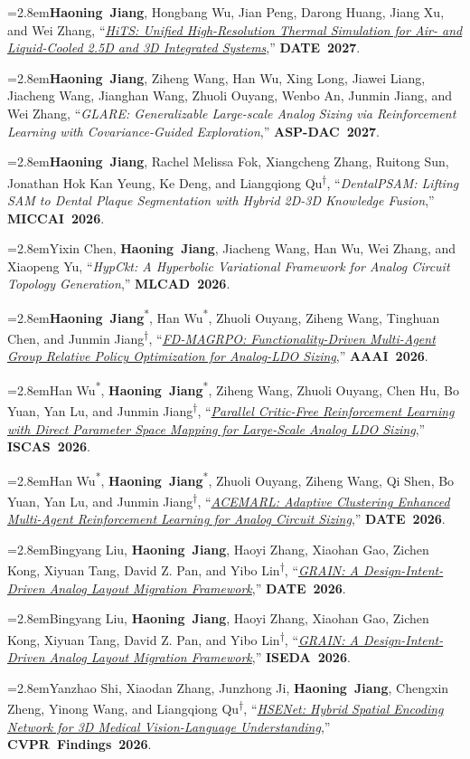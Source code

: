 \documentclass[10pt,a4paper]{article}
\newcommand{\heading}[1]{\par\addvspace{9pt}{\bfseries\underline{\MakeUppercase{#1}}}\par\nopagebreak\vspace{2pt}}
\newcommand{\me}{\textbf{Haoning~Jiang}}
\newcommand{\cor}{\textsuperscript{†}}
\newcommand{\equal}{\textsuperscript{*}}
\newcommand{\paper}[4]{%
  \par\addvspace{7pt}%
  {\raggedright\hangindent=2.8em\noindent\makebox[2.8em][l]{[#1]}#2, “\textit{#3},” \mbox{\textbf{#4}}.\par}}
\begin{document}
\heading{Publications}
\paper{C.1}{\me, Hongbang Wu, Jian Peng, Darong Huang, Jiang Xu, and Wei Zhang}{\href{https://haoningjiang-space.github.io/publication/hits-date-2027}{HiTS: Unified High-Resolution Thermal Simulation for Air- and Liquid-Cooled 2.5D and 3D Integrated Systems}}{DATE 2027}
\paper{C.2}{\me, Ziheng Wang, Han Wu, Xing Long, Jiawei Liang, Jiacheng Wang, Jianghan Wang, Zhuoli Ouyang, Wenbo An, Junmin Jiang, and Wei Zhang}{GLARE: Generalizable Large-scale Analog Sizing via Reinforcement Learning with Covariance-Guided Exploration}{ASP-DAC 2027}
\paper{C.3}{\me, Rachel Melissa Fok, Xiangcheng Zhang, Ruitong Sun, Jonathan Hok Kan Yeung, Ke Deng, and Liangqiong Qu\cor}{DentalPSAM: Lifting SAM to Dental Plaque Segmentation with Hybrid 2D-3D Knowledge Fusion}{MICCAI 2026}
\paper{C.4}{Yixin Chen, \me, Jiacheng Wang, Han Wu, Wei Zhang, and Xiaopeng Yu}{HypCkt: A Hyperbolic Variational Framework for Analog Circuit Topology Generation}{MLCAD 2026}
\paper{C.5}{\me\equal, Han Wu\equal, Zhuoli Ouyang, Ziheng Wang, Tinghuan Chen, and Junmin Jiang\cor}{\href{https://ojs.aaai.org/index.php/AAAI/article/view/39388}{FD-MAGRPO: Functionality-Driven Multi-Agent Group Relative Policy Optimization for Analog-LDO Sizing}}{AAAI 2026}
\paper{C.6}{Han Wu\equal, \me\equal, Ziheng Wang, Zhuoli Ouyang, Chen Hu, Bo Yuan, Yan Lu, and Junmin Jiang\cor}{\href{https://doi.org/10.1109/iscas66217.2026.11562731}{Parallel Critic-Free Reinforcement Learning with Direct Parameter Space Mapping for Large-Scale Analog LDO Sizing}}{ISCAS 2026}
\paper{C.7}{Han Wu\equal, \me\equal, Zhuoli Ouyang, Ziheng Wang, Qi Shen, Bo Yuan, Yan Lu, and Junmin Jiang\cor}{\href{https://doi.org/10.23919/DATE69613.2026.11539706}{ACEMARL: Adaptive Clustering Enhanced Multi-Agent Reinforcement Learning for Analog Circuit Sizing}}{DATE 2026}
\newpage
\heading{Publications (continued)}
\paper{C.8}{Bingyang Liu, \me, Haoyi Zhang, Xiaohan Gao, Zichen Kong, Xiyuan Tang, David Z. Pan, and Yibo Lin\cor}{\href{https://yibolin.com/publications/papers/ANALOG_DATE2026_Liu.pdf}{GRAIN: A Design-Intent-Driven Analog Layout Migration Framework}}{DATE 2026}
\paper{C.9}{Bingyang Liu, \me, Haoyi Zhang, Xiaohan Gao, Zichen Kong, Xiyuan Tang, David Z. Pan, and Yibo Lin\cor}{\href{https://yibolin.com/publications/papers/ANALOG_ISEDA2026_Liu.pdf}{GRAIN: A Design-Intent-Driven Analog Layout Migration Framework}}{ISEDA 2026}
\paper{C.10}{Yanzhao Shi, Xiaodan Zhang, Junzhong Ji, \me, Chengxin Zheng, Yinong Wang, and Liangqiong Qu\cor}{\href{https://arxiv.org/abs/2506.09634}{HSENet: Hybrid Spatial Encoding Network for 3D Medical Vision-Language Understanding}}{CVPR Findings 2026}
\end{document}
